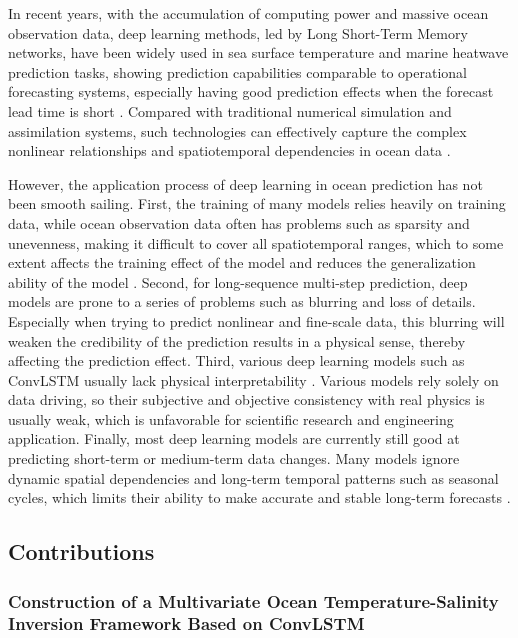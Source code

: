 \documentclass[webpdf,contemporary,large]{oup-authoring-template}
\begin{document}
In recent years, with the accumulation of computing power and massive ocean observation data, deep learning methods, led by Long Short-Term Memory networks, have been widely used in sea surface temperature and marine heatwave prediction tasks, showing prediction capabilities comparable to operational forecasting systems, especially having good prediction effects when the forecast lead time is short \cite{boninoMachineLearningMethods2024}. Compared with traditional numerical simulation and assimilation systems, such technologies can effectively capture the complex nonlinear relationships and spatiotemporal dependencies in ocean data \cite{zhaoDeepLearningOcean2024}.

However, the application process of deep learning in ocean prediction has not been smooth sailing. First, the training of many models relies heavily on training data, while ocean observation data often has problems such as sparsity and unevenness, making it difficult to cover all spatiotemporal ranges, which to some extent affects the training effect of the model and reduces the generalization ability of the model \cite{stortoCorrectionSeaSurface2025}. Second, for long-sequence multi-step prediction, deep models are prone to a series of problems such as blurring and loss of details. Especially when trying to predict nonlinear and fine-scale data, this blurring will weaken the credibility of the prediction results in a physical sense, thereby affecting the prediction effect. Third, various deep learning models such as ConvLSTM usually lack physical interpretability \cite{yangMultiFactorDeepLearning2025}. Various models rely solely on data driving, so their subjective and objective consistency with real physics is usually weak, which is unfavorable for scientific research and engineering application. Finally, most deep learning models are currently still good at predicting short-term or medium-term data changes. Many models ignore dynamic spatial dependencies and long-term temporal patterns such as seasonal cycles, which limits their ability to make accurate and stable long-term forecasts \cite{haoInterpretableCrossSphereMultiscale2025}.

\subsection{Contributions}

\subsubsection{Construction of a Multivariate Ocean Temperature-Salinity Inversion Framework Based on ConvLSTM}
\end{document}

